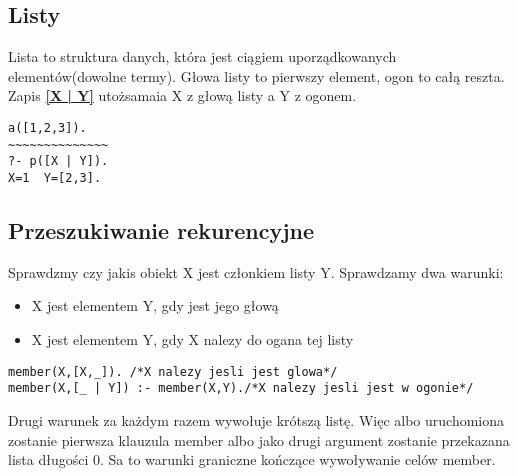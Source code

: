 \documentclass{article}
\begin{document}
\subsection{Listy}
Lista to struktura danych, która jest ciągiem uporządkowanych elementów(dowolne termy). Głowa listy to pierwszy element, ogon to całą reszta. Zapis  \textbf{\url{[X | Y]}} utożsamaia X z głową listy a Y z ogonem.
\begin{lstlisting}[caption=Utożsamianie głowy i ogona]
a([1,2,3]).
~~~~~~~~~~~~~~
?- p([X | Y]).
X=1  Y=[2,3].
\end{lstlisting}
\subsection{Przeszukiwanie rekurencyjne}
Sprawdzmy czy jakis obiekt X jest członkiem listy Y.
Sprawdzamy dwa warunki:
\begin{itemize}
\item X jest elementem Y, gdy jest jego głową
\item X jest elementem Y, gdy X nalezy do ogana tej listy
\end{itemize}
\begin{lstlisting}[caption=Rekurencja]
member(X,[X,_]). /*X nalezy jesli jest glowa*/
member(X,[_ | Y]) :- member(X,Y)./*X nalezy jesli jest w ogonie*/
\end{lstlisting}
Drugi warunek za każdym razem wywołuje krótszą listę. Więc albo uruchomiona zostanie pierwsza klauzula member albo
jako drugi argument zostanie przekazana lista długości 0. Sa to warunki graniczne kończące wywoływanie celów member.
\end{document}
